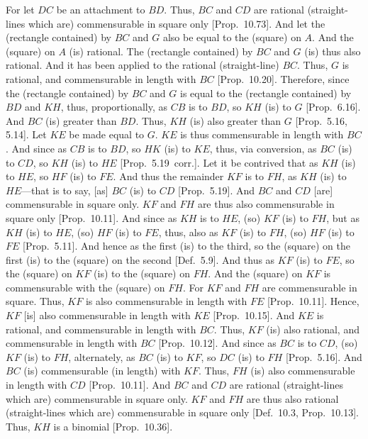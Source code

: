 \begin{Parallel}{}{}
{For let $DC$ be an attachment to $BD$. Thus, $BC$ and $CD$
are rational (straight-lines which are) commensurable in square only [Prop.~10.73]. And let the (rectangle contained)
by $BC$ and $G$ also be equal to the (square) on $A$. And the (square)
on $A$ (is) rational. The (rectangle contained) by $BC$ and $G$ (is) thus also rational. And it has been applied to the rational (straight-line) $BC$.
Thus, $G$ is rational, and commensurable in length with $BC$ [Prop.~10.20]. Therefore, since the (rectangle contained) by $BC$ and $G$ is equal to the (rectangle contained) by
$BD$ and $KH$, thus, proportionally, as $CB$ is to $BD$, so $KH$ (is) to
$G$ [Prop.~6.16]. And $BC$ (is) greater than $BD$.
Thus, $KH$ (is) also greater than $G$ [Prop.~5.16,
5.14]. Let $KE$ be made equal to $G$.
$KE$ is thus commensurable in length with $BC$. And since as
$CB$ is to $BD$, so $HK$ (is) to $KE$, thus, via conversion, as
$BC$ (is) to $CD$, so $KH$ (is) to $HE$ [Prop.~5.19~corr.]. 
Let it be contrived that as
$KH$ (is) to $HE$, so $HF$ (is) to $FE$. And thus the remainder $KF$ is to
$FH$, as $KH$ (is) to $HE$---that is to say, [as] $BC$ (is) to $CD$
[Prop.~5.19]. And $BC$ and $CD$
[are] commensurable in square only. $KF$ and $FH$ are thus also commensurable in square only [Prop.~10.11].
And since as $KH$ is to $HE$, (so) $KF$ (is) to $FH$, but as $KH$
(is) to $HE$, (so) $HF$ (is) to $FE$, thus, also as $KF$ (is) to $FH$, (so)
$HF$ (is) to $FE$ [Prop.~5.11].
And hence as the first (is) to the third,
so the (square) on the first (is) to the (square) on the second [Def.~5.9].  And thus as $KF$ (is) to $FE$, so the (square) on $KF$ (is) to the (square) on $FH$. And the (square) on $KF$
is commensurable with the (square) on $FH$. For $KF$ and $FH$
are commensurable in square. Thus, $KF$ is also commensurable
in length with  $FE$ [Prop.~10.11]. 
 Hence, $KF$ [is] also commensurable in length with $KE$
  [Prop.~10.15]. And $KE$ is rational,
and commensurable in length with $BC$.  Thus, $KF$ (is) also rational,
and commensurable in length with $BC$ [Prop.~10.12].  And since as $BC$ is to
$CD$, (so)
$KF$ (is) to $FH$, alternately, as $BC$ (is) to $KF$, so $DC$
(is) to $FH$ [Prop.~5.16]. And $BC$ (is) commensurable (in length) with $KF$. Thus, $FH$ (is) also commensurable in length with $CD$ [Prop.~10.11]. And
$BC$ and $CD$ are rational (straight-lines which are) commensurable
in square only. $KF$ and $FH$ are thus also rational (straight-lines which
are) commensurable in square only [Def.~10.3, Prop.~10.13]. Thus, $KH$ is a binomial [Prop.~10.36].

}
\end{Parallel}
